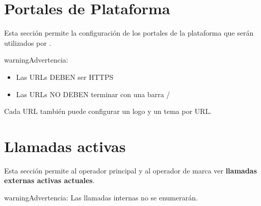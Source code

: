\documentclass[letterpaper,10pt,spanish]{sphinxmanual}
\begin{document}
\section{Portales de Plataforma}
\label{administration_portal/platform/portals:portals}\label{administration_portal/platform/portals:platform-portals}\label{administration_portal/platform/portals::doc}\label{administration_portal/platform/portals:id1}
Esta sección permite la configuración de los portales de la plataforma que serán utilizados por {\hyperref[administration_portal/platform/main_operators:main\string-operators]{}}.

\begin{notice}{warning}{Advertencia:}\begin{itemize}
\item {} 
Las URLs DEBEN ser HTTPS

\item {} 
Las URLs NO DEBEN terminar con una barra /

\end{itemize}
\end{notice}

Cada URL también puede configurar un logo y un tema por URL.
\label{administration_portal/platform/active_calls:active-calls}

\section{Llamadas activas}
\label{administration_portal/platform/active_calls:call-state}\label{administration_portal/platform/active_calls::doc}\label{administration_portal/platform/active_calls:active-calls}\label{administration_portal/platform/active_calls:id1}
Esta sección permite al operador principal y al operador de marca ver \textbf{llamadas externas activas actuales}.

\begin{notice}{warning}{Advertencia:}
Las llamadas internas no se enumerarán.
\end{notice}
\end{document}
